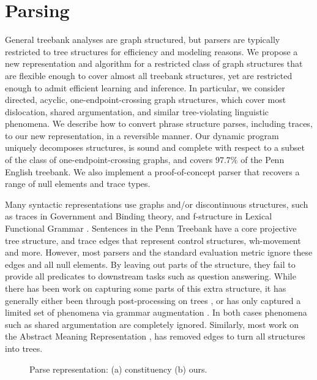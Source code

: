 \section{Parsing}

General treebank analyses are graph structured, but parsers are typically restricted to tree structures for efficiency and modeling reasons.
We propose a new representation and algorithm for a restricted class of graph structures that are flexible enough to cover almost all treebank structures, yet are restricted enough to admit efficient learning and inference.
In particular, we consider directed, acyclic, one-endpoint-crossing graph structures, which cover most dislocation, shared argumentation, and similar tree-violating linguistic phenomena.
We describe how to convert phrase structure parses, including traces, to our new representation, in a reversible manner.
Our dynamic program uniquely decomposes structures, is sound and complete with respect to a subset of the class of one-endpoint-crossing graphs, and covers $97.7\%$ of the Penn English treebank.
We also implement a proof-of-concept parser that recovers a range of null elements and trace types.

Many syntactic representations use graphs and/or discontinuous structures, such as traces in Government and Binding theory, and f-structure in Lexical Functional Grammar \parencite{gb,Bresnan:1982}.
Sentences in the Penn Treebank \parencite{ptb} have a core projective tree structure, and trace edges that represent control structures, wh-movement and more.
However, most parsers and the standard evaluation metric ignore these edges and all null elements.
By leaving out parts of the structure, they fail to provide all predicates to downstream tasks such as question answering.
While there has been work on capturing some parts of this extra structure, it has generally either been through post-processing on trees
\parencite{Johnson:2002,Jijkoun:2003,Campbell:2004,Levy:2004,Gabbard:2006},
or has only captured a limited set of phenomena via grammar augmentation
\parencite{collins:1997,dienes-dubey:2003,schmid:2006,cai-chiang-goldberg:2011}.
In both cases phenomena such as shared argumentation are completely ignored.
Similarly, most work on the Abstract Meaning Representation \parencite{amr}, has removed edges to turn all structures into trees.

\begin{figure}
  \centering
  \scalebox{0.65}{
  
  }
  \vspace{-5mm}
  \caption{\label{fig:repr}
    Parse representation: (a) constituency (b) ours.
  }
\end{figure}

